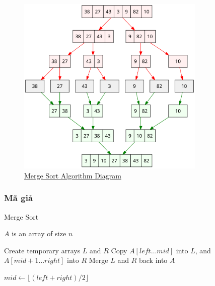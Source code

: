 \begin{figure}[H]
    \centering
    \includegraphics[width=0.8\textwidth]{img/Merge_sort_algorithm_diagram.svg.png}
    \caption{\href{https://en.wikipedia.org/wiki/File:Merge_sort_algorithm_diagram.svg.png}{Merge Sort Algorithm Diagram}}
\end{figure}

\subsubsection{Mã giả}
 
\begin{algorithm}[H]
\caption{Merge Sort}
\label{alg:merge-sort}
\begin{algorithmic}

\Require $A$ is an array of size $n$

\State Create temporary arrays $L$ and $R$
\State Copy $A[left \dots mid]$ into $L$, and $A[mid+1 \dots right]$ into $R$
\State Merge $L$ and $R$ back into $A$
\EndFunction \State

    \State $mid \gets \lfloor (left + right) / 2 \rfloor$ \State
      \State
      \State
     
\EndIf
\EndFunction

\end{algorithmic}
\end{algorithm}


